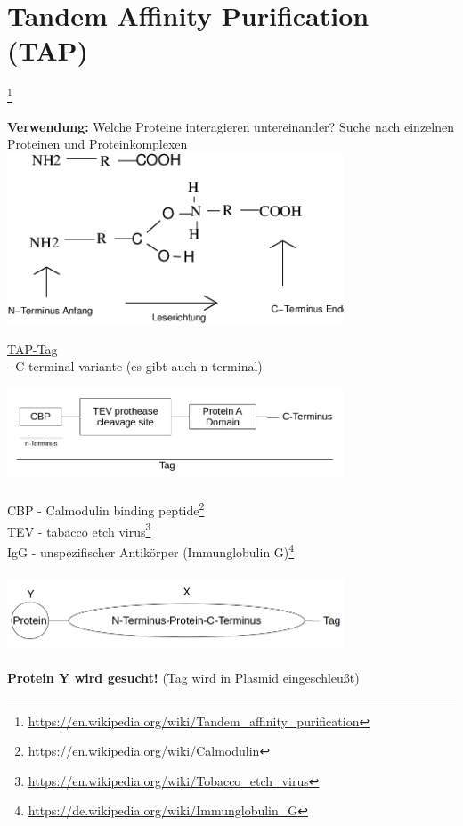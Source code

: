 \section{Tandem Affinity Purification (TAP)}\footnote{\url{https://en.wikipedia.org/wiki/Tandem_affinity_purification}}

\textbf{Verwendung:} Welche Proteine interagieren untereinander? Suche nach einzelnen Proteinen und Proteinkomplexen\\

\includegraphics[width=0.75\textwidth]{lectures/160513/pix/namenlos.png}

\underline{TAP-Tag}\\
 - C-terminal variante (es gibt auch n-terminal)

\includegraphics[width=0.75\textwidth]{lectures/160513/pix/1.jpg}
\\\\
CBP - Calmodulin binding peptide\footnote{\url{https://en.wikipedia.org/wiki/Calmodulin}}\\
TEV - tabacco etch virus\footnote{\url{https://en.wikipedia.org/wiki/Tobacco_etch_virus}}\\
IgG - unspezifischer Antikörper (Immunglobulin G)\footnote{\url{https://de.wikipedia.org/wiki/Immunglobulin_G}}
\\\\
\includegraphics[width=0.75\textwidth]{lectures/160513/pix/2.jpg}
\\\\
\textbf{Protein Y wird gesucht!} (Tag wird in Plasmid eingeschleußt)

